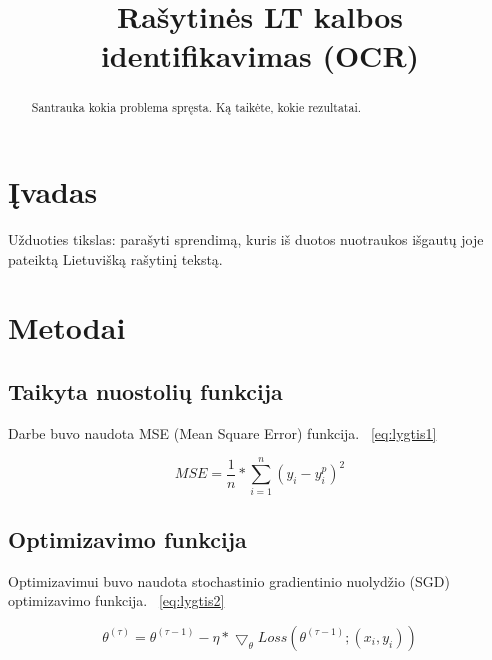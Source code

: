 \documentclass[conference]{IEEEtran}
\begin{document}
\title{Rašytinės LT kalbos identifikavimas (OCR)}

\author{
}

\maketitle

\begin{abstract}
Santrauka kokia problema spręsta. Ką taikėte, kokie rezultatai.
\end{abstract}

\section{Įvadas}
Užduoties tikslas: parašyti sprendimą, kuris iš duotos
nuotraukos išgautų joje pateiktą Lietuvišką rašytinį tekstą.

\section{Metodai}

\subsection{Taikyta nuostolių funkcija}

Darbe buvo naudota MSE (Mean Square Error) funkcija. ~\eqref{eq:lygtis1}

\begin{equation}
MSE = \frac{1}{n} * \sum_{i=1}^{n} (y_{i} - y_{i}^{p})^{2}
\label{eq:lygtis1}
\end{equation}

\subsection{Optimizavimo funkcija}

Optimizavimui buvo naudota stochastinio gradientinio nuolydžio
(SGD) optimizavimo funkcija. ~\eqref{eq:lygtis2}

\begin{equation}
\theta^{(\tau)} = \theta^{(\tau - 1)} - \eta * \bigtriangledown_{\theta} Loss(\theta^{(\tau - 1)};(x_{i}, y_{i}))
\label{eq:lygtis2}
\end{equation}
\end{document}
